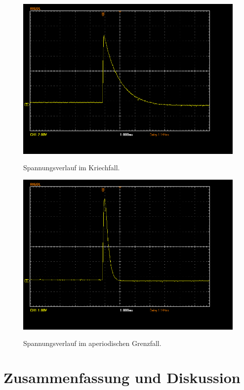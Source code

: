 \documentclass{article}
\begin{document}
\begin{figure}[H]
\caption{Spannungsverlauf im Kriechfall.}
\label{fig:kriech}
{\centering
\includegraphics[scale=0.4]{winkler/kriechfall.png}}
\end{figure}

\begin{figure}[H]
\caption{Spannungsverlauf im aperiodischen Grenzfall.}
\label{fig:kriech}
{\centering
\includegraphics[scale=0.4]{winkler/aperiodischer_grenzfall.png}}
\end{figure}


\section{Zusammenfassung und Diskussion}
\end{document}
